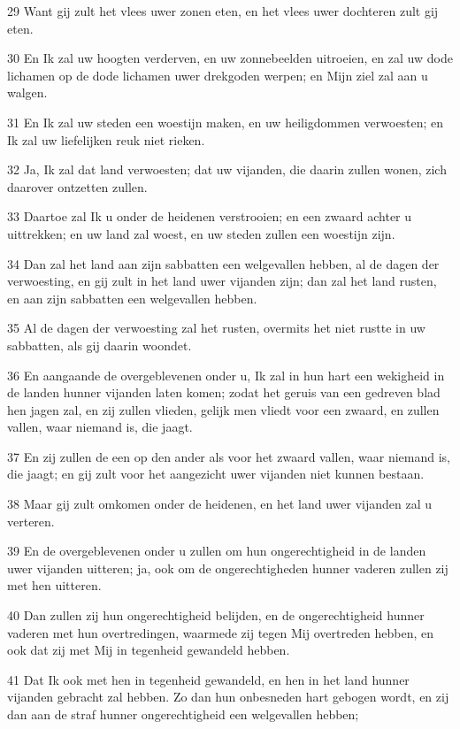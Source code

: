 \par 29 Want gij zult het vlees uwer zonen eten, en het vlees uwer dochteren zult gij eten.
\par 30 En Ik zal uw hoogten verderven, en uw zonnebeelden uitroeien, en zal uw dode lichamen op de dode lichamen uwer drekgoden werpen; en Mijn ziel zal aan u walgen.
\par 31 En Ik zal uw steden een woestijn maken, en uw heiligdommen verwoesten; en Ik zal uw liefelijken reuk niet rieken.
\par 32 Ja, Ik zal dat land verwoesten; dat uw vijanden, die daarin zullen wonen, zich daarover ontzetten zullen.
\par 33 Daartoe zal Ik u onder de heidenen verstrooien; en een zwaard achter u uittrekken; en uw land zal woest, en uw steden zullen een woestijn zijn.
\par 34 Dan zal het land aan zijn sabbatten een welgevallen hebben, al de dagen der verwoesting, en gij zult in het land uwer vijanden zijn; dan zal het land rusten, en aan zijn sabbatten een welgevallen hebben.
\par 35 Al de dagen der verwoesting zal het rusten, overmits het niet rustte in uw sabbatten, als gij daarin woondet.
\par 36 En aangaande de overgeblevenen onder u, Ik zal in hun hart een wekigheid in de landen hunner vijanden laten komen; zodat het geruis van een gedreven blad hen jagen zal, en zij zullen vlieden, gelijk men vliedt voor een zwaard, en zullen vallen, waar niemand is, die jaagt.
\par 37 En zij zullen de een op den ander als voor het zwaard vallen, waar niemand is, die jaagt; en gij zult voor het aangezicht uwer vijanden niet kunnen bestaan.
\par 38 Maar gij zult omkomen onder de heidenen, en het land uwer vijanden zal u verteren.
\par 39 En de overgeblevenen onder u zullen om hun ongerechtigheid in de landen uwer vijanden uitteren; ja, ook om de ongerechtigheden hunner vaderen zullen zij met hen uitteren.
\par 40 Dan zullen zij hun ongerechtigheid belijden, en de ongerechtigheid hunner vaderen met hun overtredingen, waarmede zij tegen Mij overtreden hebben, en ook dat zij met Mij in tegenheid gewandeld hebben.
\par 41 Dat Ik ook met hen in tegenheid gewandeld, en hen in het land hunner vijanden gebracht zal hebben. Zo dan hun onbesneden hart gebogen wordt, en zij dan aan de straf hunner ongerechtigheid een welgevallen hebben;
